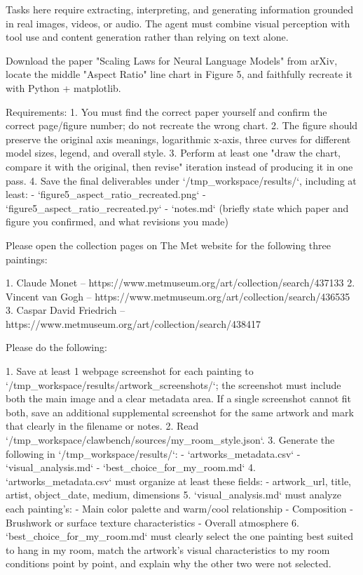 Tasks here require extracting, interpreting, and generating
information grounded in real images, videos, or audio. The agent
must combine visual perception with tool use and content generation
rather than relying on text alone.

\begin{clawcode}[title={\texttt{task\_01\_scaling\_laws\_figure5\_aspect\_ratio}}]
Download the paper "Scaling Laws for Neural Language Models" from
arXiv, locate the middle "Aspect Ratio" line chart in Figure 5, and
faithfully recreate it with Python + matplotlib.

Requirements:
1. You must find the correct paper yourself and confirm the correct
   page/figure number; do not recreate the wrong chart.
2. The figure should preserve the original axis meanings, logarithmic
   x-axis, three curves for different model sizes, legend, and overall
   style.
3. Perform at least one "draw the chart, compare it with the original,
   then revise" iteration instead of producing it in one pass.
4. Save the final deliverables under `/tmp_workspace/results/`,
   including at least:
   - `figure5_aspect_ratio_recreated.png`
   - `figure5_aspect_ratio_recreated.py`
   - `notes.md` (briefly state which paper and figure you confirmed,
     and what revisions you made)
\end{clawcode}

\begin{clawcode}[title={\texttt{task\_22\_met\_art\_room\_match}}]
Please open the collection pages on The Met website for the following
three paintings:

1. Claude Monet -- https://www.metmuseum.org/art/collection/search/437133
2. Vincent van Gogh -- https://www.metmuseum.org/art/collection/search/436535
3. Caspar David Friedrich -- https://www.metmuseum.org/art/collection/search/438417

Please do the following:

1. Save at least 1 webpage screenshot for each painting to
   `/tmp_workspace/results/artwork_screenshots/`; the screenshot must
   include both the main image and a clear metadata area. If a single
   screenshot cannot fit both, save an additional supplemental
   screenshot for the same artwork and mark that clearly in the
   filename or notes.
2. Read `/tmp_workspace/clawbench/sources/my_room_style.json`.
3. Generate the following in `/tmp_workspace/results/`:
   - `artworks_metadata.csv`
   - `visual_analysis.md`
   - `best_choice_for_my_room.md`
4. `artworks_metadata.csv` must organize at least these fields:
   - artwork_url, title, artist, object_date, medium, dimensions
5. `visual_analysis.md` must analyze each painting's:
   - Main color palette and warm/cool relationship
   - Composition
   - Brushwork or surface texture characteristics
   - Overall atmosphere
6. `best_choice_for_my_room.md` must clearly select the one painting
   best suited to hang in my room, match the artwork's visual
   characteristics to my room conditions point by point, and explain
   why the other two were not selected.
\end{clawcode}


